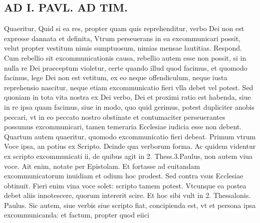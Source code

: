 \documentclass{article}
\begin{document}
\begin{pages}
\section*{AD I. PAVL. AD TIM. }
\marginpar{[ p.MB. ]}\pstart Quaeritur, Quid si ea res, propter quam quis reprehenditur, verbo Dei non est expresse dannata et definita, Vtrum perseuerans in ea excommunicari possit, velut propter vestitum nimis sumptuosum, nimias mensae lautitias. Respond. Cum rebellio sit excommunicationis causa, rebellio autem esse non possit, si in nulla re Dei praeceptum violetur, certe quando illud quod facimus, et quomodo facimus, lege Dei non est vetitum, ex eo neque offendiculum, neque iusta reprehensio nascitur, neque etiam excommunicatio fieri vlla debet vel potest. Sed quoniam in tota vita nostra ex Dei verbo, Dei et proximi ratio est habenda, siue in re ipsa quam facimus, siue in modo, quo quid gerimus, potest dupliciter anobis peccari, vt in eo peccato nostro obstinate et contumaciter perseuerantes possumus excommunicari, tamen temeraria Ecclesiae iudicia esse non debent. Quartum autem quaeritur, quomodo excommunicatio fieri debeat. Primum vtrum Voce ipsa, an potius ex Scripto. Deinde qua verborum forma. Ac quidem videntur ex scripto excommunicati ii, de quibus agit in 2. Thess.3.Paulus, non autem viua voce. Ait enim, notate per Epistolam. Et fortasse ad euitandam excommunicatorum inuidiam et odium hoc prodest. Sed contra vsus Ecclesiae obtinuit. Fieri enim vina voce solet: scripto tamem potest. Vtcunque ea postea debet aliis innotescere, quorum intererit scire. Et hoc sibi vult in 2. Thessalonis. Paulus. Sic autem, siue verbis siue scripto fiat, concipienda est, vt et persona ipsa excommunicanda: et factum, propter quod eiici\pend

\end{pages}
\end{document}
